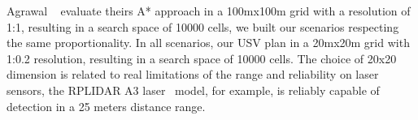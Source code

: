     Agrawal \etal ~\cite{Agrawal2015COLREGS} evaluate theirs A* approach in a 100mx100m grid with a resolution of 1:1, resulting in a search space of 10000 cells, we built our scenarios respecting the same proportionality. In all scenarios, our \ac{USV} plan in a 20mx20m grid with 1:0.2 resolution, resulting in a search space of 10000 cells. The choice of 20x20 dimension is related to real limitations of the range and reliability on laser sensors, the RPLIDAR A3 laser~\cite{RPLidarA3} model, for example, is reliably capable of detection in a 25 meters distance range.
